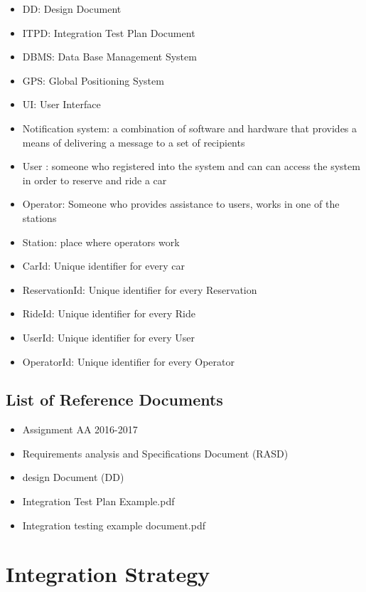 \documentclass{article}
\begin{document}
\begin{flushleft}
\begin{itemize}
  \item DD: Design Document
  \item ITPD:  Integration Test Plan Document
  \item DBMS: Data Base Management System
  \item GPS: Global Positioning System
  \item UI: User Interface
  \item Notification system: a combination of software and hardware that provides a means of delivering a message to a set of recipients
  \item User : someone who registered into the system and can can access the system in order to reserve and ride a car  
  \item Operator: Someone who provides assistance to users, works in one of the stations
  \item Station: place where operators work
  \item CarId: Unique identifier for every car
  \item ReservationId: Unique identifier for every Reservation 
  \item RideId: Unique identifier for every Ride
  \item UserId: Unique identifier for every User
  \item OperatorId: Unique identifier for every Operator
  
  \end{itemize}
  
 
  
  \subsection{List of Reference Documents}		%
  \begin{itemize}
   \item Assignment AA 2016-2017
    \item Requirements analysis and Specifications Document (RASD)
     \item design Document (DD)
      \item Integration Test Plan Example.pdf
      \item Integration testing example document.pdf
  \end{itemize}
  
  
  \newpage
  \section{Integration Strategy }  		%

\end{flushleft}
\end{document}
